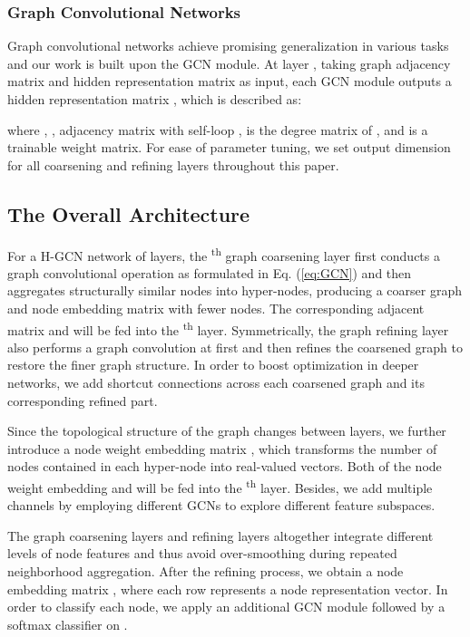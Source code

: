 \documentclass{article}
\begin{document}
\subsubsection{Graph Convolutional Networks}

Graph convolutional networks achieve promising generalization in various tasks and our work is built upon the GCN module. At layer , taking graph adjacency matrix  and hidden representation matrix  as input, each GCN module outputs a hidden representation matrix , which is described as:

where , , adjacency matrix with self-loop ,   is the degree matrix of , and  is a trainable weight matrix. For ease of parameter tuning, we set output dimension  for all coarsening and refining layers throughout this paper.

\subsection{The Overall Architecture}

For a H-GCN network of  layers, the \textsuperscript{th} graph coarsening layer first conducts a graph convolutional operation as formulated in Eq. (\ref{eq:GCN}) and then aggregates structurally similar nodes into hyper-nodes, producing a coarser graph  and node embedding matrix  with fewer nodes. The corresponding adjacent matrix  and  will be fed into the \textsuperscript{th} layer. Symmetrically, the graph refining layer also performs a graph convolution at first and then refines the coarsened graph to restore the finer graph structure. In order to boost optimization in deeper networks, we add shortcut connections \cite{7780459} across each coarsened graph and its corresponding refined part.

Since the topological structure of the graph changes between layers, we further introduce a node weight embedding matrix , which transforms the number of nodes contained in each hyper-node into real-valued vectors. Both of the node weight embedding and  will be fed into the \textsuperscript{th} layer. Besides, we add multiple channels by employing different GCNs to explore different feature subspaces.

The graph coarsening layers and refining layers altogether integrate different levels of node features and thus avoid over-smoothing during repeated neighborhood aggregation. After the refining process, we obtain a node embedding matrix , where each row represents a node representation vector. In order to classify each node, we apply an additional GCN module followed by a softmax classifier on .
\end{document}
